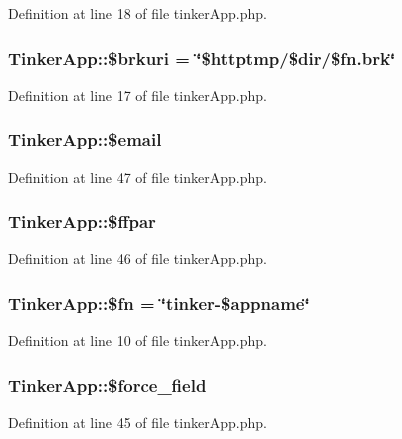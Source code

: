Definition at line 18 of file tinker\-App.php.
\subsubsection{\setlength{\rightskip}{0pt plus 5cm}Tinker\-App::\$brkuri = \char`\"{}\$httptmp/\$dir/\$fn.brk\char`\"{}}\label{classTinkerApp_o4}




Definition at line 17 of file tinker\-App.php.
\subsubsection{\setlength{\rightskip}{0pt plus 5cm}Tinker\-App::\$email}\label{classTinkerApp_o21}




Definition at line 47 of file tinker\-App.php.
\subsubsection{\setlength{\rightskip}{0pt plus 5cm}Tinker\-App::\$ffpar}\label{classTinkerApp_o20}




Definition at line 46 of file tinker\-App.php.
\subsubsection{\setlength{\rightskip}{0pt plus 5cm}Tinker\-App::\$fn = \char`\"{}tinker-\$appname\char`\"{}}\label{classTinkerApp_o1}




Definition at line 10 of file tinker\-App.php.
\subsubsection{\setlength{\rightskip}{0pt plus 5cm}Tinker\-App::\$force\_\-field}\label{classTinkerApp_o19}




Definition at line 45 of file tinker\-App.php.
